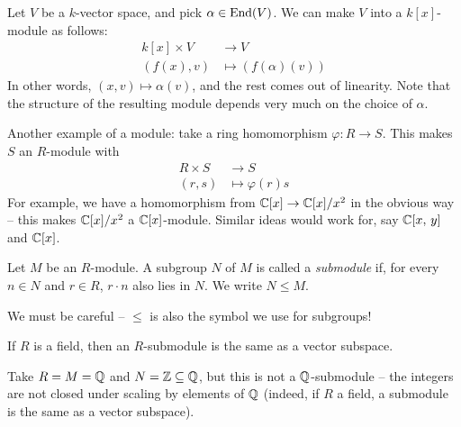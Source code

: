\documentclass{../../template/note}
\begin{document}
    \begin{example*}
        Let $V$ be a $k$-vector space, and pick $\alpha \in \operatorname{End}(V)$. We can make $V$ into a $k[x]$-module as follows:
        \begin{align*}
            k[x] \times V &\to V \\
            (f(x), v) &\mapsto (f(\alpha)(v))
        \end{align*}
        In other words, $(x, v) \mapsto \alpha(v)$, and the rest comes out of linearity. Note that the structure of the resulting module depends very much on the choice of $\alpha$.        
    \end{example*}

    
    \begin{example*}
        Another example of a module: take a ring homomorphism $\varphi: R \to S$. This makes $S$ an $R$-module with
        \begin{align*}
            R \times S &\to S \\
            (r, s) &\mapsto \varphi(r)s
        \end{align*}
        For example, we have a homomorphism from $\mathbb C[x] \to \mathbb C[x]/x^2$ in the obvious way -- this makes $\mathbb C[x]/x^2$ a $\mathbb C[x]$-module. Similar ideas would work for, say $\mathbb C[x,\,y]$ and $\mathbb C[x]$.        
    \end{example*}
    
    \begin{definition}[Submodules]
        Let $M$ be an $R$-module. A subgroup $N$ of $M$ is called a \emph{submodule} if, for every $n \in N$ and $r \in R$, $r \cdot n$ also lies in $N$. We write $N \leq M$.
    \end{definition}

    \begin{remark*}
        We must be careful -- $\leq$ is also the symbol we use for subgroups!
    \end{remark*}       

    \begin{remark*}
        If $R$ is a field, then an $R$-submodule is the same as a vector subspace.
    \end{remark*}    
    
    \begin{example*}
        Take $R = M = \mathbb Q$ and $N = \mathbb Z \subseteq \mathbb Q$, but this is not a $\mathbb Q$-submodule -- the integers are not closed under scaling by elements of $\mathbb Q$ (indeed, if $R$ a field, a submodule is the same as a vector subspace).
    \end{example*}
    
\end{document}
